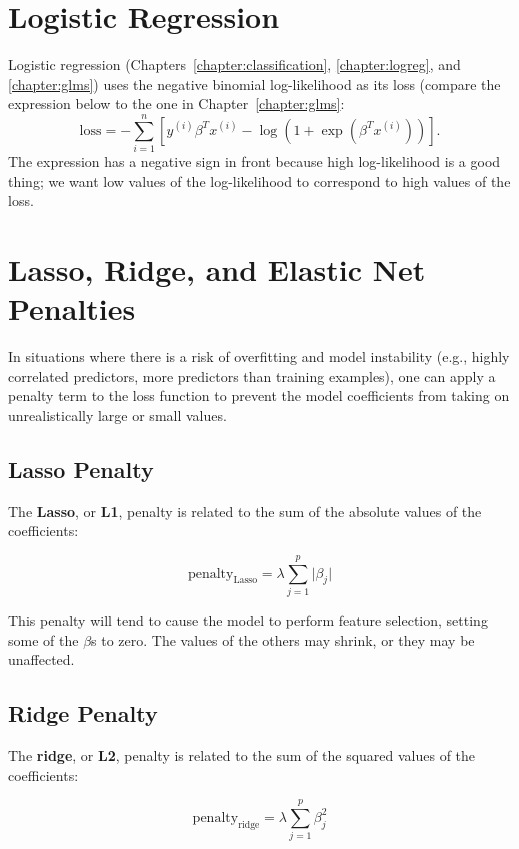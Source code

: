 \section{Logistic Regression}

Logistic regression (Chapters~\ref{chapter:classification}, \ref{chapter:logreg}, and \ref{chapter:glms}) uses the negative binomial log-likelihood as its loss (compare the expression below to the one in Chapter~\ref{chapter:glms}:
$$ \text{loss} = -\sum_{i=1}^n \left[ y^{(i)} \beta^T x^{(i)} - \log \left(1 + \exp(\beta^T x^{(i)}) \right) \right]. $$
The expression has a negative sign in front because high log-likelihood is a good thing; we want low values of the log-likelihood to correspond to high values of the loss.


\section{Lasso, Ridge, and Elastic Net Penalties}

In situations where there is a risk of overfitting and model instability (e.g., highly correlated predictors, more predictors than training examples), one can apply a penalty term to the loss function to prevent the model coefficients from taking on unrealistically large or small values. 

\subsection{Lasso Penalty}

The \textbf{Lasso}, or \textbf{L1}, penalty is related to the sum of the absolute values of the coefficients:

$$ \text{penalty}_\text{Lasso} = \lambda \sum_{j=1}^p \vert \beta_j \vert $$

This penalty will tend to cause the model to perform feature selection, setting some of the $\beta$s to zero. The values of the others may shrink, or they may be unaffected. 

\subsection{Ridge Penalty}

The \textbf{ridge}, or \textbf{L2}, penalty is related to the sum of the squared values of the coefficients:

$$ \text{penalty}_\text{ridge} = \lambda \sum_{j=1}^p \beta_j^2 $$

